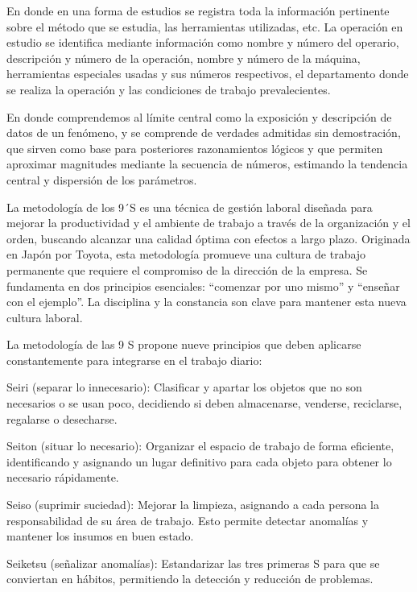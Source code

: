     
    En donde en una forma de estudios se registra toda la información pertinente sobre el método que se estudia, las herramientas utilizadas, etc. La operación en estudio se identifica mediante información como nombre y número del operario, descripción y número de la operación, nombre y número de la máquina, herramientas especiales usadas y sus números respectivos, el departamento donde se realiza la operación y las condiciones de trabajo prevalecientes. 
    \cite{niebel1980ingenieria}
    
    
    
    En donde comprendemos al límite central como la exposición y descripción de datos de un fenómeno, y se comprende de verdades admitidas sin demostración, que sirven como base para posteriores razonamientos lógicos y que permiten aproximar magnitudes mediante la secuencia de números, estimando la tendencia central y dispersión de los parámetros. \cite{RAE}
    
    La metodología de los 9´S es una técnica de gestión laboral diseñada para mejorar la productividad y el ambiente de trabajo a través de la organización y el orden, buscando alcanzar una calidad óptima con efectos a largo plazo. Originada en Japón por Toyota, esta metodología promueve una cultura de trabajo permanente que requiere el compromiso de la dirección de la empresa. Se fundamenta en dos principios esenciales: “comenzar por uno mismo” y “enseñar con el ejemplo”. La disciplina y la constancia son clave para mantener esta nueva cultura laboral.
    
    
    La metodología de las 9 S propone nueve principios que deben aplicarse constantemente para integrarse en el trabajo diario:
    
    Seiri (separar lo innecesario): Clasificar y apartar los objetos que no son necesarios o se usan poco, decidiendo si deben almacenarse, venderse, reciclarse, regalarse o desecharse.
    
    Seiton (situar lo necesario): Organizar el espacio de trabajo de forma eficiente, identificando y asignando un lugar definitivo para cada objeto para obtener lo necesario rápidamente.
    
    Seiso (suprimir suciedad): Mejorar la limpieza, asignando a cada persona la responsabilidad de su área de trabajo. Esto permite detectar anomalías y mantener los insumos en buen estado.
    
    Seiketsu (señalizar anomalías): Estandarizar las tres primeras S para que se conviertan en hábitos, permitiendo la detección y reducción de problemas.
    
